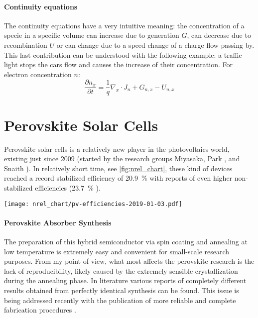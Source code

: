 	\paragraph{Continuity equations} The continuity equations have a very intuitive meaning: the concentration of a specie in a specific volume can increase due to generation $G$, can decrease due to recombination $U$ or can change due to a speed change of a charge flow passing by. This last contribution can be understood with the following example: a traffic light stops the cars flow and causes the increase of their concentration. For electron concentration $n$:	
$$\frac{\partial n_x}{\partial t} = \frac{1}{q}\nabla_x \cdot J_n + G_{n,x} - U_{n,x}$$

\section{Perovskite Solar Cells}

	Perovskite solar cells is a relatively new player in the photovoltaics world, existing just since 2009 (started by the research groups Miyasaka\cite{Kojima2009}, Park \cite{Im2011a,Kim2012b}, and Snaith \cite{Lee2012}). In relatively short time, see \cref{fig:nrel_chart}, these kind of devices reached a record stabilized efficiency of 20.9~\% \cite{Green2019} with reports of even higher non-stabilized efficiencies (23.7~\% \cite{Green2019,Jiang2017}).


	\begin{SCfigure}
		\centering
		\texttt{[image: nrel\_chart/pv-efficiencies-2019-01-03.pdf]}
		\label{fig:nrel_chart}
	\end{SCfigure}


	\paragraph{Perovskite Absorber Synthesis}
	The preparation of this hybrid semiconductor via spin coating and annealing at low temperature is extremely easy and convenient for small-scale research purposes. From my point of view, what most affects the perovskite research is the lack of reproducibility, likely caused by the extremely sensible crystallization during the annealing phase. In literature various reports of completely different results obtained from perfectly identical synthesis can be found\cite{Pockett2015,Gottesman2014}. This issue is being addressed recently with the publication of more reliable and complete fabrication procedures \cite{Saliba2018}.
	
